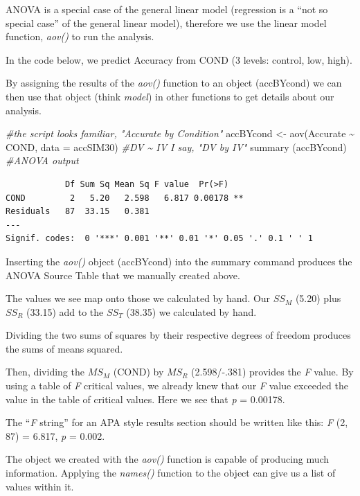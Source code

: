 \documentclass[
  english,
]{book}
\newenvironment{Shaded}{\begin{snugshade}}{\end{snugshade}}
\newcommand{\AttributeTok}[1]{\textcolor[rgb]{0.77,0.63,0.00}{#1}}
\newcommand{\CommentTok}[1]{\textcolor[rgb]{0.56,0.35,0.01}{\textit{#1}}}
\newcommand{\FunctionTok}[1]{\textcolor[rgb]{0.00,0.00,0.00}{#1}}
\newcommand{\NormalTok}[1]{#1}
\newcommand{\OtherTok}[1]{\textcolor[rgb]{0.56,0.35,0.01}{#1}}
\newcommand{\SpecialCharTok}[1]{\textcolor[rgb]{0.00,0.00,0.00}{#1}}
\begin{document}
ANOVA is a special case of the general linear model (regression is a ``not so special case'' of the general linear model), therefore we use the linear model function, \emph{aov()} to run the analysis.

In the code below, we predict Accuracy from COND (3 levels: control, low, high).

By assigning the results of the \emph{aov()} function to an object (accBYcond) we can then use that object (think \emph{model}) in other functions to get details about our analysis.

\begin{Shaded}
\begin{Highlighting}[]
\CommentTok{\#the script looks familiar, "Accurate by Condition"}
\NormalTok{accBYcond }\OtherTok{\textless{}{-}} \FunctionTok{aov}\NormalTok{(Accurate }\SpecialCharTok{\textasciitilde{}}\NormalTok{ COND, }\AttributeTok{data =}\NormalTok{ accSIM30) }\CommentTok{\#DV \textasciitilde{} IV  I say, "DV by IV"}
\FunctionTok{summary}\NormalTok{ (accBYcond) }\CommentTok{\#ANOVA output}
\end{Highlighting}
\end{Shaded}

\begin{verbatim}
            Df Sum Sq Mean Sq F value  Pr(>F)   
COND         2   5.20   2.598   6.817 0.00178 **
Residuals   87  33.15   0.381                   
---
Signif. codes:  0 '***' 0.001 '**' 0.01 '*' 0.05 '.' 0.1 ' ' 1
\end{verbatim}

Inserting the \emph{aov()} object (accBYcond) into the summary command produces the ANOVA Source Table that we manually created above.

The values we see map onto those we calculated by hand. Our \(SS_M\) (5.20) plus \(SS_R\) (33.15) add to the \(SS_T\) (38.35) we calculated by hand.

Dividing the two sums of squares by their respective degrees of freedom produces the sums of means squared.

Then, dividing the \(MS_M\) (COND) by \(MS_R\) (2.598/-.381) provides the \emph{F} value. By using a table of \emph{F} critical values, we already knew that our \emph{F} value exceeded the value in the table of critical values. Here we see that \emph{p} = 0.00178.

The ``\emph{F} string'' for an APA style results section should be written like this: \emph{F} (2, 87) = 6.817, \emph{p} = 0.002.

The object we created with the \emph{aov()} function is capable of producing much information. Applying the \emph{names()} function to the object can give us a list of values within it.
\end{document}
